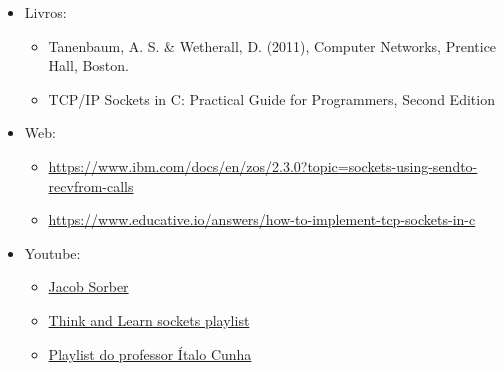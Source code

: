 \documentclass{article}
\begin{document}
\begin{itemize}
      \item Livros:
            \begin{itemize}
                  \item Tanenbaum, A. S. \& Wetherall, D. (2011), Computer
                        Networks, Prentice Hall, Boston.
                  \item TCP/IP Sockets in C\@: Practical Guide for Programmers,
                        Second Edition
            \end{itemize}

      \item Web:
            \begin{itemize}
                  \item

                        \url{https://www.ibm.com/docs/en/zos/2.3.0?topic=sockets-using-sendto-recvfrom-calls}
                  \item

                        \url{https://www.educative.io/answers/how-to-implement-tcp-sockets-in-c}

            \end{itemize}

      \item Youtube:
            \begin{itemize}
                  \item \href{https://www.youtube.com/@JacobSorber}{Jacob
                              Sorber}
                  \item

                        \href{https://www.youtube.com/watch?v=_lQ-3S4fJ0U&list=PLPyaR5G9aNDvs6TtdpLcVO43_jvxp4emI}{Think
                              and Learn sockets playlist}
                  \item

                        \href{https://www.youtube.com/watch?v=tJ3qNtv0HVs&t=2s}{Playlist do professor
                              Ítalo Cunha}
            \end{itemize}

\end{itemize}
\end{document}
